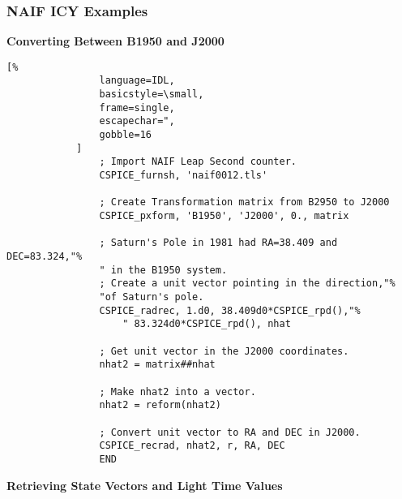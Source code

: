 \documentclass[crop=false,class=article,oneside]{standalone}
\begin{document}
    \subsubsection{NAIF ICY Examples}
            \textbf{Converting Between B1950 and J2000}
            \begin{lstlisting}[%
                language=IDL,
                basicstyle=\small,
                frame=single,
                escapechar=",
                gobble=16
            ]
                ; Import NAIF Leap Second counter.
                CSPICE_furnsh, 'naif0012.tls'

                ; Create Transformation matrix from B2950 to J2000
                CSPICE_pxform, 'B1950', 'J2000', 0., matrix

                ; Saturn's Pole in 1981 had RA=38.409 and DEC=83.324,"%
                " in the B1950 system.
                ; Create a unit vector pointing in the direction,"%
                "of Saturn's pole.
                CSPICE_radrec, 1.d0, 38.409d0*CSPICE_rpd(),"%
                    " 83.324d0*CSPICE_rpd(), nhat

                ; Get unit vector in the J2000 coordinates.
                nhat2 = matrix##nhat

                ; Make nhat2 into a vector.
                nhat2 = reform(nhat2)

                ; Convert unit vector to RA and DEC in J2000.
                CSPICE_recrad, nhat2, r, RA, DEC
                END
            \end{lstlisting}
            \textbf{Retrieving State Vectors and Light Time Values}
\end{document}
